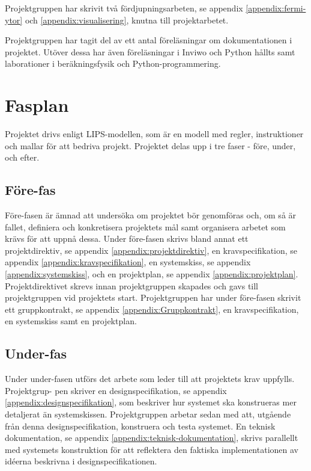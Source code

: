 \documentclass[a4paper,12pt]{article}
\begin{document}
Projektgruppen har skrivit två fördjupningsarbeten, se appendix \ref{appendix:fermi-ytor} och \ref{appendix:visualisering}, knutna till projektarbetet.

Projektgruppen har tagit del av ett antal föreläsningar om dokumentationen i projektet. Utöver dessa har även föreläsningar i Inviwo och Python hållts samt laborationer i beräkningsfysik och Python-programmering. 

\section{Fasplan}
\label{ch:fasplan}
Projektet drivs enligt LIPS-modellen, som är en modell med regler, instruktioner och mallar för att bedriva projekt. Projektet delas upp i tre faser - före, under, och efter.

\subsection{Före-fas}
Före-fasen är ämnad att undersöka om projektet bör genomföras och, om så är fallet, definiera och konkretisera projektets mål samt organisera arbetet som krävs för att uppnå dessa. Under före-fasen skrivs bland annat ett projektdirektiv, se appendix \ref{appendix:projektdirektiv}, en kravspecifikation, se appendix \ref{appendix:kravspecifikation}, en systemskiss, se appendix \ref{appendix:systemskiss}, och en projektplan, se appendix \ref{appendix:projektplan}. Projektdirektivet skrevs innan projektgruppen skapades och gavs till projektgruppen vid projektets start.
Projektgruppen har under före-fasen skrivit ett gruppkontrakt, se appendix \ref{appendix:Gruppkontrakt}, en kravspecifikation, en systemskiss samt en projektplan.

\subsection{Under-fas}
Under  under-fasen  utförs  det  arbete  som  leder  till  att  projektets  krav  uppfylls.  Projektgrup-
pen skriver en designspecifikation, se appendix \ref{appendix:designspecifikation},
som beskriver hur systemet ska konstrueras mer detaljerat än
systemskissen. Projektgruppen arbetar sedan med att, utgående från denna designspecifikation, konstruera och testa systemet. En teknisk dokumentation, se appendix \ref{appendix:teknisk-dokumentation}, skrivs parallellt med systemets konstruktion för att reflektera den faktiska implementationen av idéerna beskrivna i designspecifikationen. 
\end{document}
